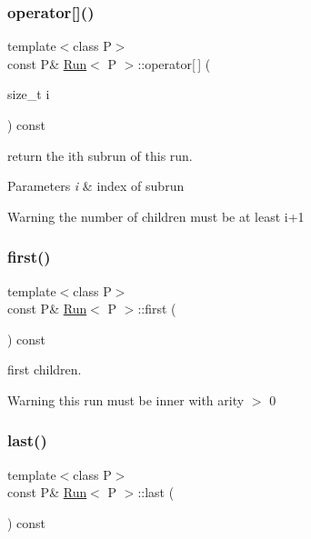 \subsubsection{\texorpdfstring{operator[]()}{operator[]()}}
{\footnotesize\ttfamily template$<$class P$>$ \\
const P\& \mbox{\hyperlink{classRun}{Run}}$<$ P $>$\+::operator\mbox{[}$\,$\mbox{]} (\begin{DoxyParamCaption}\item[{size\+\_\+t}]{i }\end{DoxyParamCaption}) const\hspace{0.3cm}{\ttfamily [inline]}}



return the ith subrun of this run. 


\begin{DoxyParams}{Parameters}
{\em i} & index of subrun \\
\hline
\end{DoxyParams}
\begin{DoxyWarning}{Warning}
the number of children must be at least i+1 
\end{DoxyWarning}
\mbox{\label{classRun_a6b635ca66114e64fbcb91a5a9652d78d}} 
\subsubsection{\texorpdfstring{first()}{first()}}
{\footnotesize\ttfamily template$<$class P$>$ \\
const P\& \mbox{\hyperlink{classRun}{Run}}$<$ P $>$\+::first (\begin{DoxyParamCaption}{ }\end{DoxyParamCaption}) const}



first children. 

\begin{DoxyWarning}{Warning}
this run must be inner with arity $>$ 0 
\end{DoxyWarning}
\mbox{\label{classRun_a49c0418a8ab9eb372e09d7d5c813e0aa}} 
\subsubsection{\texorpdfstring{last()}{last()}}
{\footnotesize\ttfamily template$<$class P$>$ \\
const P\& \mbox{\hyperlink{classRun}{Run}}$<$ P $>$\+::last (\begin{DoxyParamCaption}{ }\end{DoxyParamCaption}) const}



